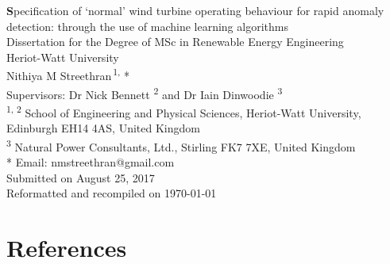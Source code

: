 \documentclass[a4paper,11pt,openany]{book}
\title{\textbf\documenttitle}
\author{\authorname}
\date{\documentdate}
\def \documenttitle {Specification of `normal' wind turbine operating behaviour for rapid anomaly detection: through the use of machine learning algorithms}
\def \authorname {Nithiya M Streethran}
\def \documentdate {August 25, 2017}
\def \programme {MSc in Renewable Energy Engineering}
\begin{document}
    \frontmatter
    \begin{titlepage}
        \hspace{0pt} %
        \vfill %
        \centering %
        \huge\textbf\documenttitle
        \\[2cm]
        \Large Dissertation for the Degree of \programme
        \\
        Heriot-Watt University
        \\[2cm]
        \authorname \textsuperscript{\,1, }*
        \\[.3cm]
        Supervisors: Dr Nick Bennett \textsuperscript{2} and Dr Iain Dinwoodie \textsuperscript{3}
        \\[.3cm]
        \large
        \textsuperscript{1, 2} School of Engineering and Physical Sciences, Heriot-Watt University, Edinburgh EH14 4AS, United Kingdom
        \\[.1cm]
        \textsuperscript{3} Natural Power Consultants, Ltd., Stirling FK7 7XE, United Kingdom
        \\[.3cm]
        * Email: nmstreethran@gmail.com
        \\[2cm]
        \Large
        Submitted on \documentdate
        \\[.3cm]
        Reformatted and recompiled on \today
        \vfill %
        \hspace{0pt} %
    \end{titlepage}
    
    \tableofcontents
    \listoffigures
    \listoftables

    \mainmatter
    
    
    
    
    

    {
        \backmatter
        
        \chapter{References}
        \printbibliography[heading=none]
    }

    \appendix
    \renewcommand{\thechapter}{\Alph{chapter}}
    
\end{document}
